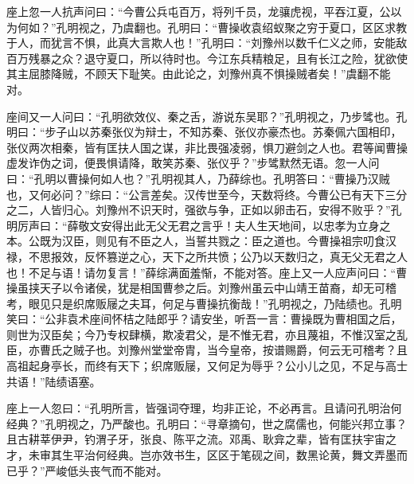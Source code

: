 座上忽一人抗声问曰：“今曹公兵屯百万，将列千员，龙骧虎视，平吞江夏，公以为何如？”孔明视之，乃虞翻也。孔明曰：“曹操收袁绍蚁聚之穷于夏口，区区求教于人，而犹言不惧，此真大言欺人也！”孔明曰：“刘豫州以数千仁义之师，安能敌百万残暴之众？退守夏口，所以待时也。今江东兵精粮足，且有长江之险，犹欲使其主屈膝降贼，不顾天下耻笑。由此论之，刘豫州真不惧操贼者矣！”虞翻不能对。

座间又一人问曰：“孔明欲效仪、秦之舌，游说东吴耶？”孔明视之，乃步骘也。孔明曰：“步子山以苏秦张仪为辩士，不知苏秦、张仪亦豪杰也。苏秦佩六国相印，张仪两次相秦，皆有匡扶人国之谋，非比畏强凌弱，惧刀避剑之人也。君等闻曹操虚发诈伪之词，便畏惧请降，敢笑苏秦、张仪乎？”步骘默然无语。忽一人问曰：“孔明以曹操何如人也？”孔明视其人，乃薛综也。孔明答曰：“曹操乃汉贼也，又何必问？”综曰：“公言差矣。汉传世至今，天数将终。今曹公已有天下三分之二，人皆归心。刘豫州不识天时，强欲与争，正如以卵击石，安得不败乎？”孔明厉声曰：“薛敬文安得出此无父无君之言乎！夫人生天地间，以忠孝为立身之本。公既为汉臣，则见有不臣之人，当誓共戮之：臣之道也。今曹操祖宗叨食汉禄，不思报效，反怀篡逆之心，天下之所共愤；公乃以天数归之，真无父无君之人也！不足与语！请勿复言！”薛综满面羞惭，不能对答。座上又一人应声问曰：“曹操虽挟天子以令诸侯，犹是相国曹参之后。刘豫州虽云中山靖王苗裔，却无可稽考，眼见只是织席贩屦之夫耳，何足与曹操抗衡哉！”孔明视之，乃陆绩也。孔明笑曰：“公非袁术座间怀桔之陆郎乎？请安坐，听吾一言：曹操既为曹相国之后，则世为汉臣矣；今乃专权肆横，欺凌君父，是不惟无君，亦且蔑祖，不惟汉室之乱臣，亦曹氏之贼子也。刘豫州堂堂帝胄，当今皇帝，按谱赐爵，何云无可稽考？且高祖起身亭长，而终有天下；织席贩屦，又何足为辱乎？公小儿之见，不足与高士共语！”陆绩语塞。

座上一人忽曰：“孔明所言，皆强词夺理，均非正论，不必再言。且请问孔明治何经典？”孔明视之，乃严酸也。孔明曰：“寻章摘句，世之腐儒也，何能兴邦立事？且古耕莘伊尹，钓渭子牙，张良、陈平之流。邓禹、耿弇之辈，皆有匡扶宇宙之才，未审其生平治何经典。岂亦效书生，区区于笔砚之间，数黑论黄，舞文弄墨而已乎？”严峻低头丧气而不能对。


